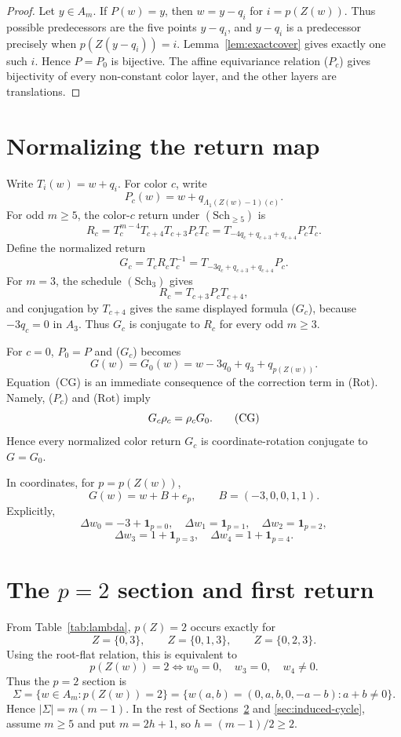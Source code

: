 \documentclass[11pt]{article}
\theoremstyle{definition}
\newcommand{\one}{\mathbf 1}
\begin{document}
\begin{proof}
Let \(y\in A_m\).  If \(P(w)=y\), then \(w=y-q_i\) for \(i=p(Z(w))\).  Thus possible predecessors are
the five points \(y-q_i\), and \(y-q_i\) is a predecessor precisely when \(p(Z(y-q_i))=i\).
Lemma~\ref{lem:exactcover} gives exactly one such \(i\).  Hence \(P=P_0\) is bijective.  The affine
equivariance relation \textup{(\(P_c\))} gives bijectivity of every non-constant color layer, and the
other layers are translations.
\end{proof}


\section{Normalizing the return map}\label{sec:normalizing}

Write \(T_i(w)=w+q_i\).  For color \(c\), write
\[
P_c(w)=w+q_{\Lambda_1(Z(w)-1)(c)}.
\]
For odd \(m\ge5\), the color-\(c\) return under \((\mathrm{Sch}_{\ge5})\) is
\[
R_c=T_c^{m-4}T_{c+4}T_{c+3}P_cT_c
    =T_{-4q_c+q_{c+3}+q_{c+4}}P_cT_c.
\]
Define the normalized return
\[
G_c=T_cR_cT_c^{-1}=T_{-3q_c+q_{c+3}+q_{c+4}}P_c. \tag{$G_c$}
\]
For \(m=3\), the schedule \((\mathrm{Sch}_3)\) gives
\[
R_c=T_{c+3}P_cT_{c+4},
\]
and conjugation by \(T_{c+4}\) gives the same displayed formula \textup{(\(G_c\))}, because
\(-3q_c=0\) in \(A_3\).  Thus \(G_c\) is conjugate to \(R_c\) for every odd \(m\ge3\).

For \(c=0\), \(P_0=P\) and \textup{(\(G_c\))} becomes
\[
\boxed{G(w)=G_0(w)=w-3q_0+q_3+q_{p(Z(w))}.}
\tag{$G$}
\]
Equation~\textup{(\(\mathrm{CG}\))} is an immediate consequence of the correction term in
\textup{(\(\mathrm{Rot}\))}.  Namely, \textup{(\(P_c\))} and \textup{(\(\mathrm{Rot}\))} imply
\[
G_c\rho_c=\rho_cG_0. \tag{$\mathrm{CG}$}
\]
Hence every normalized color return \(G_c\) is coordinate-rotation conjugate to \(G=G_0\).

In coordinates, for \(p=p(Z(w))\),
\[
G(w)=w+B+e_p,
\qquad B=(-3,0,0,1,1).
\tag{$G_1$}
\]
Explicitly,
\[
\Delta w_0=-3+\one_{p=0},\quad
\Delta w_1=\one_{p=1},\quad
\Delta w_2=\one_{p=2},
\]
\[
\Delta w_3=1+\one_{p=3},\quad
\Delta w_4=1+\one_{p=4}.
\tag{$G_2$}
\]

\section{The \texorpdfstring{\(p=2\)}{p=2} section and first return}\label{sec:first-return}

From Table~\ref{tab:lambda}, \(p(Z)=2\) occurs exactly for
\[
Z=\{0,3\},\qquad Z=\{0,1,3\},\qquad Z=\{0,2,3\}.
\]
Using the root-flat relation, this is equivalent to
\[
p(Z(w))=2\iff w_0=0,\quad w_3=0,\quad w_4\ne0.
\]
Thus the \(p=2\) section is
\[
\Sigma=\{w\in A_m:p(Z(w))=2\}
=
\{w(a,b)=(0,a,b,0,-a-b):a+b\ne0\}.
\]
Hence \(|\Sigma|=m(m-1)\).  In the rest of Sections~\ref{sec:first-return} and
\ref{sec:induced-cycle}, assume \(m\ge5\) and put \(m=2h+1\), so \(h=(m-1)/2\ge2\).
\end{document}
